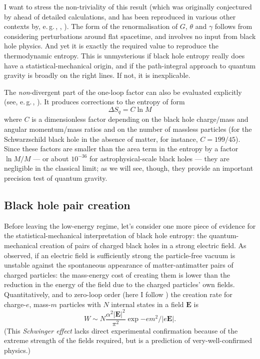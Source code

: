 \documentclass{article}
\newcommand{\egc}{\mbox{e.\,g.\,}}
\newcommand{\vctr}[1]{\ensuremath{\mathbf{ #1 }}}
\newcommand{\be}{\begin{equation}}
\newcommand{\ee}{\end{equation}}
\begin{document}
I want to stress the non-triviality of this result (which was originally conjectured by  ahead of detailed calculations, and has been reproduced in various other contexts by, \egc, , ). The form of the renormalisation of $G$, $\theta$ and $\gamma$ follows from considering perturbations around flat spacetime, and involves no input from black hole physics. And yet it is exactly the required value to reproduce the thermodynamic entropy. This is  unmysterious if black hole entropy really does have a statistical-mechanical origin, and if the path-integral approach to quantum gravity is broadly on the right lines. If not, it is inexplicable.

The \emph{non}-divergent part of the one-loop factor can also be evaluated explicitly (see, \egc, ). It produces corrections to the entropy of form
\be
\Delta S_q = C \ln M
\ee
where $C$ is a dimensionless factor depending on the black hole charge/mass and angular momentum/mass ratios and on the number of massless particles (for the Schwarzschild black hole in the absence of matter, for instance,  $C=199/45$). Since these factors are smaller than the area term in the entropy by a factor $\ln M/M$ --- or about $10^{-36}$ for astrophysical-scale black holes --- they are negligible in the classical limit; as we will see, though, they provide an important precision test of quantum gravity.

\subsection{Black hole pair creation}

Before leaving the low-energy regime, let's consider one more piece of evidence for the statistical-mechanical interpretation of black hole entropy: the quantum-mechanical creation of pairs of charged black holes in a strong electric field. As  observed, if an electric field is sufficiently strong the particle-free vacuum is unstable against the spontaneous appearance of matter-antimatter pairs of charged particles: the mass-energy cost of creating them is lower than the reduction in the energy of the field due to the charged particles' own fields. Quantitatively, and to zero-loop order (here I follow ) the creation rate for charge-$e$, mass-$m$ particles with $N$ internal states in a field $\vctr{E}$ is
\be
W \sim N\frac{\alpha^2|\vctr{E}|^2}{\pi^2}\exp{- e m^2/|e\vctr{E}|}.
\ee
(This \emph{Schwinger effect} lacks direct experimental confirmation because of the extreme strength of the fields required, but is a prediction of very-well-confirmed physics.) 
\end{document}
